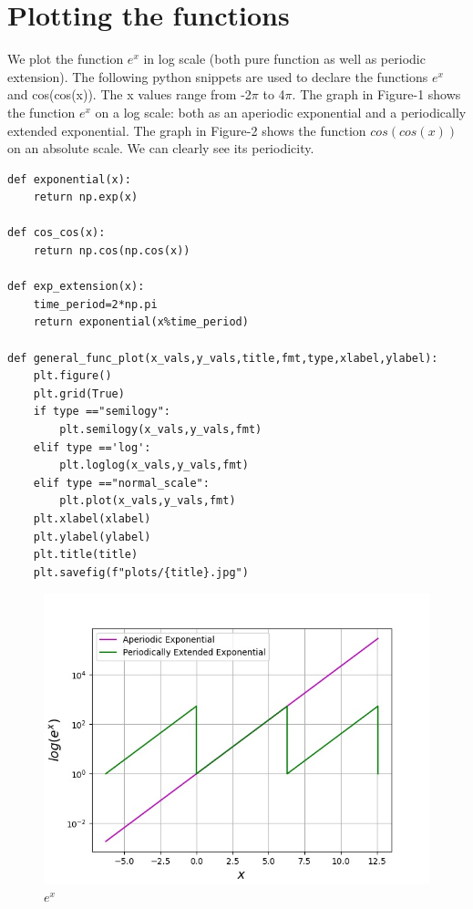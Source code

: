 \documentclass{article}
\begin{document}
\section{Plotting the functions}

We plot the function $e^x$ in log scale (both pure function as well as periodic extension). The following python snippets are used to declare the functions $e^x$ and cos(cos(x)). The x values range from -2${\pi}$ to 4${\pi}$.
The graph in Figure-1 shows the function $e^x$ on a log scale: both as an aperiodic exponential and a periodically extended exponential. The graph in Figure-2 shows the function $cos(cos(x))$ on an absolute scale. We can
clearly see its periodicity.

\begin{lstlisting}
def exponential(x):
    return np.exp(x)    

def cos_cos(x):
    return np.cos(np.cos(x))

def exp_extension(x):
    time_period=2*np.pi  
    return exponential(x%time_period)
    
def general_func_plot(x_vals,y_vals,title,fmt,type,xlabel,ylabel):
    plt.figure()
    plt.grid(True)
    if type =="semilogy":
        plt.semilogy(x_vals,y_vals,fmt)
    elif type =='log':
        plt.loglog(x_vals,y_vals,fmt)
    elif type =="normal_scale":
        plt.plot(x_vals,y_vals,fmt)
    plt.xlabel(xlabel)
    plt.ylabel(ylabel)
    plt.title(title)
    plt.savefig(f"plots/{title}.jpg")
\end{lstlisting}

\begin{figure}[!tbh]
    \centering
    \includegraphics[scale=0.65]{plots/exponential.jpg}
    \caption{$e^x$}
    \label{fig:Figure 1}
    \end{figure}
    
\end{document}
